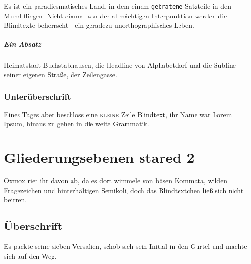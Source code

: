 \documentclass[%
	12pt,%
	a4paper,%
	oneside,%
	listof=totoc,
 	index=totoc,
	bibliography = totoc,
	parskip = half,%
	chapterprefix=false,%
	appendixprefix, %
	headings=small,%
]{scrreprt}
\begin{document}
Es ist ein paradiesmatisches Land, in dem einem \texttt{gebratene} Satzteile in den Mund fliegen. Nicht einmal von der allmächtigen Interpunktion werden die Blindtexte beherrscht - ein geradezu unorthographisches Leben.

\paragraph*{Ein Absatz}
Heimatstadt Buchstabhausen, die Headline von Alphabetdorf und die Subline seiner eigenen Straße, der Zeilengasse.

\subsection*{Unterüberschrift}

Eines Tages aber beschloss eine \textsc{kleine} Zeile Blindtext, ihr Name war Lorem Ipsum, hinaus zu gehen in die weite Grammatik.

\chapter*{Gliederungsebenen stared 2}
\label{sec:Gliederung4}

Oxmox riet ihr davon ab, da es dort wimmele von bösen Kommata, wilden Fragezeichen und hinterhältigen Semikoli, doch das Blindtextchen ließ sich nicht beirren.

\section*{Überschrift}

Es packte seine sieben Versalien, schob sich sein Initial in den Gürtel und machte sich auf den Weg.

%
%
\end{document}
